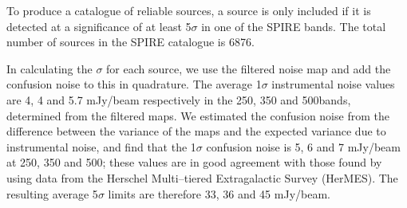 To produce a catalogue of reliable sources, a source is only included
if it is detected at a significance of at least 5$\sigma$ in one of
the SPIRE bands. The total number of sources in the SPIRE catalogue is
6876.

In calculating the $\sigma$ for each source, we use the filtered noise
map and add the confusion noise to this in quadrature. The average
1$\sigma$ instrumental noise values are 4, 4 and 5.7 mJy/beam
respectively in the 250, 350 and 500\mic bands, determined from the
filtered maps. We estimated the confusion noise from the difference
between the variance of the maps and the expected variance due to
instrumental noise, and find that the 1$\sigma$ confusion noise is 5,
6 and 7 mJy/beam at 250, 350 and 500\mic; these values are in good
agreement with those found by \citet{nguyen} using data from the
Herschel Multi--tiered Extragalactic Survey (HerMES). The resulting
average 5$\sigma$ limits are therefore 33, 36 and 45 mJy/beam.
